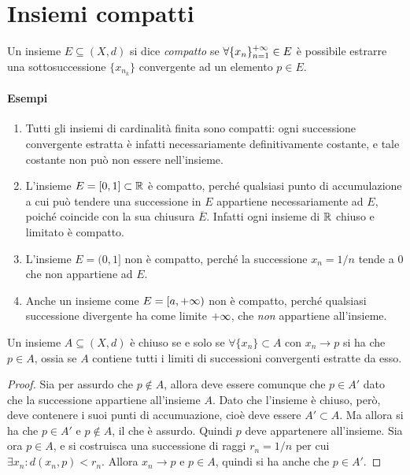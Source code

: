 \section{Insiemi compatti}
\begin{definizione}
Un insieme $E\subseteq(X,d)$ si dice \emph{compatto} se $\forall\{x_n\}_{n=1}^{+\infty}\in E$ è possibile estrarre una sottosuccessione $\{x_{n_k}\}$ convergente ad un elemento $p\in E$.
\end{definizione}
\paragraph{Esempi}
\begin{enumerate}
\item Tutti gli insiemi di cardinalità finita sono compatti: ogni successione convergente estratta è infatti necessariamente definitivamente costante, e tale costante non può non essere nell'insieme.
\item L'insieme $E=[0,1]\subset\mathbb{R}$ è compatto, perché qualsiasi punto di accumulazione a cui può tendere una successione in $E$ appartiene necessariamente ad $E$, poiché coincide con la sua chiusura $\overline{E}$. Infatti ogni insieme di $\mathbb{R}$ chiuso e limitato è compatto.
\item L'insieme $E=(0,1]$ non è compatto, perché la successione $x_n=1/n$ tende a 0 che non appartiene ad $E$.
\item Anche un insieme come $E=[a,+\infty)$ non è compatto, perché qualsiasi successione divergente ha come limite $+\infty$, che \emph{non} appartiene all'insieme.
\end{enumerate}
\begin{lemma}
Un insieme $A\subseteq(X,d)$ è chiuso se e solo se $\forall\{x_n\}\subset A$ con $x_n\to p$ si ha che $p\in A$, ossia se $A$ contiene tutti i limiti di successioni convergenti estratte da esso.
\end{lemma}
\begin{proof}
Sia per assurdo che $p\notin A$, allora deve essere comunque che $p\in A'$ dato che la successione appartiene all'insieme $A$. Dato che l'insieme è chiuso, però, deve contenere i suoi punti di accumuazione, cioè deve essere $A'\subset A$. Ma allora si ha che $p\in A'$ e $p\notin A$, il che è assurdo. Quindi $p$ deve appartenere all'insieme.
Sia ora $p\in A$, e si costruisca una successione di raggi $r_n=1/n$ per cui $\exists x_n\colon d(x_n,p)<r_n$. Allora $x_n\to p$ e $p\in A$, quindi si ha anche che $p\in A'$.
\end{proof}
